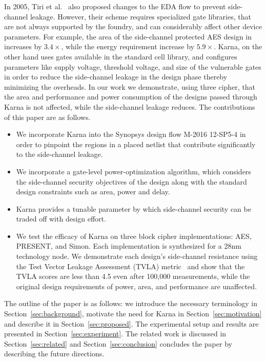  In 2005, Tiri et al.~\cite{Verbauwhede:2005} also proposed changes to the EDA flow to prevent side-channel leakage. 
However, their scheme requires specialized gate libraries, that are not always supported by the foundry, and can considerably affect other device parameters. For example, the area of the side-channel protected AES design in~\cite{Verbauwhede:2005} increases by $3.4\times$, while the energy requirement increase by $5.9\times$. {\sf Karna}, on the other hand uses gates available in the standard cell library, and configures parameters like supply voltage, threshold voltage, and size of the vulnerable gates in order to reduce the side-channel leakage in the design phase thereby minimizing the overheads. In our work we demonstrate, using three cipher, that the area and performance and power consumption of the  designs passed through {\sf Karna} is not affected, while the side-channel leakage reduces.
The contributions of this paper are as follows.
\begin{itemize}[leftmargin=1pc]
\item We incorporate {\sf Karna} into the Synopsys design flow {M-2016 12-SP5-4} in order to pinpoint the regions in a placed netlist that contribute significantly to the side-channel leakage. 
\item We incorporate a gate-level power-optimization algorithm, which considers the side-channel security objectives of the design along with the standard design constraints such as area, power and delay.
\item {\sf Karna} provides a tunable parameter by which side-channel security can be traded off with design effort.
\item We test the efficacy of {\sf Karna} on three block cipher implementations: AES, PRESENT, and Simon. Each implementation is synthesized for a 28nm technology node. We demonstrate each design's side-channel resistance using the Test Vector Leakage Assessment (TVLA) metric~\cite{becker:2013} and show that the TVLA scores are less than 4.5 even after 100,000 measurements, while the original design requirements of power, area, and performance are unaffected.
 \end{itemize}

\noindent The outline of the paper is as follows: we introduce the necessary terminology in Section~\ref{sec:background}, motivate the need for {\sf Karna} in Section~\ref{sec:motivation} and describe it in Section~\ref{sec:proposed}. The experimental setup and results are presented in Section~\ref{sec:experiment}. The related work is discussed in Section~\ref{sec:related} and Section~\ref{sec:conclusion} concludes the paper by describing the future directions.









